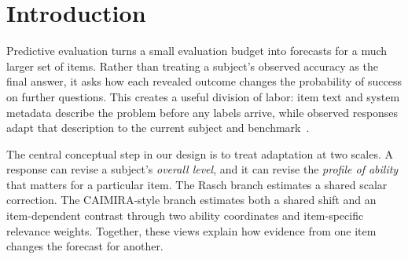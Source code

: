 \begin{abstract}
A handful of observed responses can sharpen forecasts of an AI system's future performance. We present \modelname{}, a compact evaluator that combines two complementary views of adaptation. A Rasch branch updates the system's overall ability; a two-dimensional CAIMIRA-style branch determines how the update transfers across items. Both start from item text and subject metadata, and their probabilities receive equal weight. The CAIMIRA update decomposes into a shared shift and a content-dependent contrast, making the route from revealed evidence to new forecasts explicit. Our selected PAIEC candidate, , achieves formative Brier area under the learning curve of \textbf{0.160822}. Across nine subject--benchmark pairs, mean Brier error falls from 0.212061 with zero labels to 0.126671 with 31 labels, a \textbf{40.27\% reduction}. Every pair improves at the final budget, and seven labels capture 76.20\% of the observed endpoint gain. The archive contains 3,076 fitted coefficients and runs with local CPU computation. We explain its adaptation geometry, analyze the complete learning curve, and develop hierarchical evidence sharing and calibrated gating as complementary extensions.
\end{abstract}

\section{Introduction}
Predictive evaluation turns a small evaluation budget into forecasts for a much larger set of items. Rather than treating a subject's observed accuracy as the final answer, it asks how each revealed outcome changes the probability of success on further questions. This creates a useful division of labor: item text and system metadata describe the problem before any labels arrive, while observed responses adapt that description to the current subject and benchmark~\citep{paiec2026}.

The central conceptual step in our design is to treat adaptation at two scales. A response can revise a subject's \emph{overall level}, and it can revise the \emph{profile of ability} that matters for a particular item. The Rasch branch estimates a shared scalar correction. The CAIMIRA-style branch estimates both a shared shift and an item-dependent contrast through two ability coordinates and item-specific relevance weights. Together, these views explain how evidence from one item changes the forecast for another.

